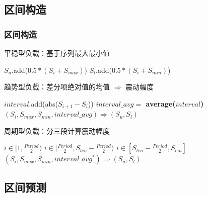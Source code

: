 \subsection{区间构造}

\begin{frame}
\frametitle{区间构造}
\begin{block}{平稳型负载：基于序列最大最小值}
\begin{algorithmic}[1]
    \State $S_u$.add($0.5*(S_i + S_{max})$)
    \State $S_l$.add($0.5*(S_i + S_{min})$)
\end{algorithmic}
\end{block}
\begin{block}{趋势型负载：差分项绝对值的均值 $\Rightarrow$ 震动幅度}
\begin{algorithmic}[1]
    \State $interval$.add(abs($S_{i+1} - S_i$))
    \State \textbf{$interval\_avg =$ average($interval$)}
    \State $(S_i, S_{max}, S_{min}, interval\_avg) \Rightarrow (S_u, S_l)$
\end{algorithmic}
\end{block}
\begin{block}{周期型负载：分三段计算震动幅度}
\begin{algorithmic}[1]
    \State $i \in [1, \frac{Period}{2})$
    \State $i \in [\frac{Period}{2}, S_{len} - \frac{Period}{2})$
    \State $i \in [S_{len} - \frac{Period}{2}, S_{len}]$
    \State $(S_i, S_{max}, S_{min}, interval\_avg^{*}) \Rightarrow (S_u, S_l)$
\end{algorithmic}
\end{block}
\end{frame}

\subsection{区间预测}

